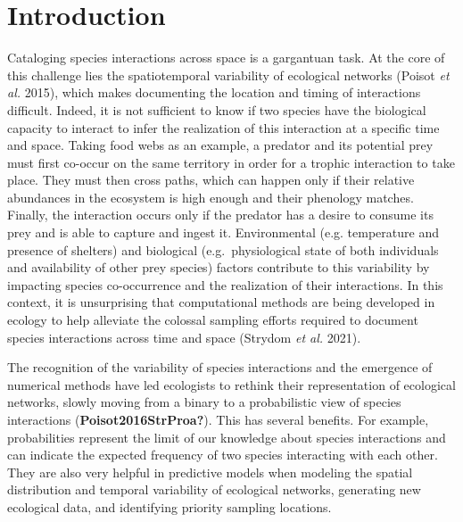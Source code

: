 \documentclass[11pt]{article}
\begin{document}
\vfill

\clearpage
\linenumbers
\pagestyle{normal}

\hypertarget{introduction}{%
\section{Introduction}\label{introduction}}

Cataloging species interactions across space is a gargantuan task. At
the core of this challenge lies the spatiotemporal variability of
ecological networks (Poisot \emph{et al.} 2015), which makes documenting
the location and timing of interactions difficult. Indeed, it is not
sufficient to know if two species have the biological capacity to
interact to infer the realization of this interaction at a specific time
and space. Taking food webs as an example, a predator and its potential
prey must first co-occur on the same territory in order for a trophic
interaction to take place. They must then cross paths, which can happen
only if their relative abundances in the ecosystem is high enough and
their phenology matches. Finally, the interaction occurs only if the
predator has a desire to consume its prey and is able to capture and
ingest it. Environmental (e.g. temperature and presence of shelters) and
biological (e.g.~physiological state of both individuals and
availability of other prey species) factors contribute to this
variability by impacting species co-occurrence and the realization of
their interactions. In this context, it is unsurprising that
computational methods are being developed in ecology to help alleviate
the colossal sampling efforts required to document species interactions
across time and space (Strydom \emph{et al.} 2021).

The recognition of the variability of species interactions and the
emergence of numerical methods have led ecologists to rethink their
representation of ecological networks, slowly moving from a binary to a
probabilistic view of species interactions
(\textbf{Poisot2016StrProa?}). This has several benefits. For example,
probabilities represent the limit of our knowledge about species
interactions and can indicate the expected frequency of two species
interacting with each other. They are also very helpful in predictive
models when modeling the spatial distribution and temporal variability
of ecological networks, generating new ecological data, and identifying
priority sampling locations.
\end{document}
